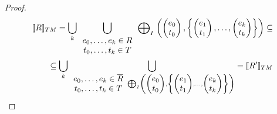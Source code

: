 \begin{enumerate}
\begin{proof}
\begin{align*}
[\![ R ]\!]_{TM} = \bigcup_{k}{
\bigcup_{
\begin{array}{c}
e_0, \dots,e_k \in R \\
t_0, \dots,t_k \in T
\end{array}
}{ 
\mathrel{\bigoplus}_I
\left(
\begin{pmatrix}
e_0 \\
t_0 
\end{pmatrix},
\left\{
\begin{pmatrix}
e_1 \\
t_1 
\end{pmatrix},
\dots ,
\begin{pmatrix}
e_k \\
t_k 
\end{pmatrix}
\right\}
\right)
}
} \subseteq  \\
\subseteq \bigcup_{k}{
\bigcup_{
\begin{array}{c}
e_0, \dots,e_k \in \overline{R} \\
t_0, \dots,t_k \in T
\end{array}
\mathrel{\bigoplus}_I
\left(
\begin{pmatrix}
e_0 \\
t_0 
\end{pmatrix},
\left\{
\begin{pmatrix}
e_1 \\
t_1 
\end{pmatrix},
\dots ,
\begin{pmatrix}
e_k \\
t_k 
\end{pmatrix}
\right\}
\right) 
}
} = [\![ R' ]\!]_{TM} 
\end{align*}


\end{proof}
\end{enumerate}
